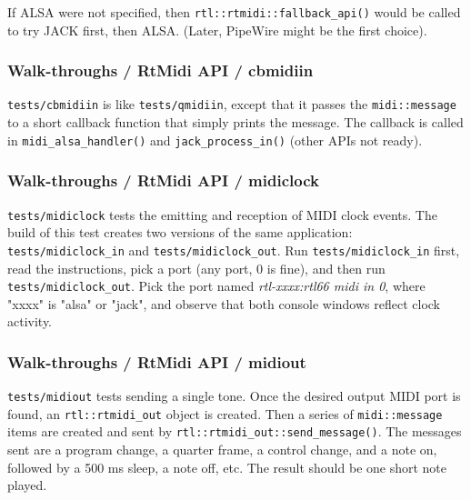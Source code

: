    If ALSA were not specified, then
   \texttt{rtl::rtmidi::fallback\_api()} would be
   called to try JACK first, then ALSA.
   (Later, PipeWire might be the first choice).


\subsubsection{Walk-throughs / RtMidi API / cbmidiin}
\label{sec:walkthroughs_rtmidi_api_cbmidiin}

   \texttt{tests/cbmidiin} is like
   \texttt{tests/qmidiin}, except that it passes the
   \texttt{midi::message} to a short callback function that
   simply prints the message.
   The callback is called in
   \texttt{midi\_alsa\_handler()} and
   \texttt{jack\_process\_in()} (other APIs not ready).

\subsubsection{Walk-throughs / RtMidi API / midiclock}
\label{sec:walkthroughs_rtmidi_api_midiclock}

   \texttt{tests/midiclock} tests the emitting and reception of MIDI clock
   events. The build of this test creates two versions of the same
   application:
   \texttt{tests/midiclock\_in} and
   \texttt{tests/midiclock\_out}.
   Run \texttt{tests/midiclock\_in} first, read the instructions, pick a
   port (any port, 0 is fine), and then run
   \texttt{tests/midiclock\_out}.
   Pick the port named \textsl{rtl-xxxx:rtl66 midi in 0}, where "xxxx" is
   "alsa" or "jack",
   and observe that both console windows reflect clock activity.

\subsubsection{Walk-throughs / RtMidi API / midiout}
\label{sec:walkthroughs_rtmidi_api_midiout}

   \texttt{tests/midiout} tests sending a single tone.
   Once the desired output MIDI port is found, an
   \texttt{rtl::rtmidi\_out} object is created.
   Then a series of \texttt{midi::message} items are created and
   sent by \texttt{rtl::rtmidi\_out::send\_message()}.
   The messages sent are a program change, a quarter frame, a control
   change, and a note on, followed by a 500 ms sleep, a note off,
   etc.  The result should be one short note played.

